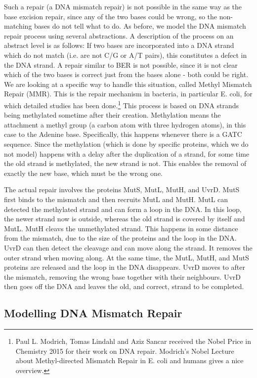 \documentclass[review]{elsarticle}
\begin{document}
Such a repair (a DNA mismatch repair) is not possible in the same way as the base excision repair, since any of the two bases could be wrong, so the non-matching  bases do not tell what to do. As before, we model the DNA mismatch repair process using several abstractions. A description of the process on an abstract level is as follows: If two bases are incorporated into a DNA strand which do not match (i.e. are not C/G or A/T pairs), this constitutes a defect in the DNA strand. A repair similar to BER is not possible, since it is not clear which of the two bases is correct just from the bases alone - both could be right. We are looking at a specific way to handle this situation, called Methyl Mismatch Repair (MMR). This is the repair mechanism in bacteria, in particular E. coli, for which detailed studies has been done.\footnote{Paul L. Modrich, Tomas Lindahl and Aziz Sancar received the Nobel Price in Chemistry 2015 for their work on DNA repair. Modrich's Nobel Lecture about Methyl-directed Mismatch Repair in E. coli and humans \cite{pmid27198632} gives a nice overview.} This process is based on DNA strands being methylated sometime after their creation. Methylation means the attachment a methyl group (a carbon atom with three hydrogen atoms), in this case to the Adenine base. Specifically, this happens whenever there is a GATC sequence. Since the methylation (which is done by specific proteins, which we do not model) happens with a delay after the duplication of a strand, for some time the old strand is methylated, the new strand is not. This enables the removal of exactly the new base, which must be the wrong one.

The actual repair involves the proteins MutS, MutL, MutH, and UvrD. MutS first binds to the mismatch and then recruits MutL and MutH. MutL can detected the methylated strand and can form a loop in the DNA. In this loop, the newer strand now is outside, whereas the old strand is covered by itself and MutL. MutH cleavs the unmethylated strand. This happens in some distance from the mismatch, due to the size of the proteins and the loop in the DNA. UvrD can then detect the cleavage and can move along the strand. It removes the outer strand when moving along. At the same time, the MutL, MutH, and MutS proteins are released and the loop in the DNA disappears. UvrD moves to after the mismatch, removing the wrong base together with their neighbours. UvrD then goes off the DNA and leaves the old, and correct, strand to be completed. 

\subsection{Modelling DNA Mismatch Repair}
\end{document}
